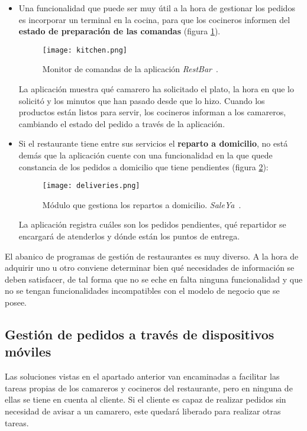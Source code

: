 \begin{itemize}
    \item Una funcionalidad que puede ser muy útil a la hora de gestionar
    los pedidos es incorporar un terminal en la cocina, para que los cocineros
    informen del \textbf{estado de preparación de las comandas} (figura
    \ref{fig:kitchen}).

    \begin{figure}[!h]
      \begin{center}
        \texttt{[image: kitchen.png]}
        \caption{Monitor de comandas de la aplicación
        \emph{RestBar}~\cite{bib:restBar}.}
        \label{fig:kitchen}
      \end{center}
    \end{figure}
    
    La aplicación muestra qué camarero ha solicitado el plato, la hora en que
    lo solicitó y los minutos que han pasado desde que lo hizo. Cuando los
    productos están listos para servir, los cocineros informan a los
    camareros, cambiando el estado del pedido a través de la aplicación.

    \item Si el restaurante tiene entre sus servicios el \textbf{reparto a
    domicilio}, no está demás que la aplicación cuente con una funcionalidad
    en la que quede constancia de los pedidos a domicilio que tiene pendientes
    (figura \ref{fig:deliveries}):

    \begin{figure}[!h]
      \begin{center}
        \texttt{[image: deliveries.png]}
        \caption{Módulo que gestiona los repartos a domicilio.
        \emph{SaleYa}~\cite{bib:saleYa}.}
        \label{fig:deliveries}
      \end{center}
    \end{figure}

    La aplicación registra cuáles son los pedidos pendientes, qué repartidor
    se encargará de atenderlos y dónde están los puntos de entrega.
    \end{itemize}

    El abanico de programas de gestión de restaurantes es muy diverso. A la
    hora de adquirir uno u otro conviene determinar bien qué necesidades de
    información se deben satisfacer, de tal forma que no se eche en falta 
    ninguna funcionalidad y que no se tengan funcionalidades incompatibles
    con el modelo de negocio que se posee.

    \subsection{Gestión de pedidos a través de dispositivos móviles}
    Las soluciones vistas en el apartado anterior van encaminadas a
    facilitar las tareas propias de los camareros y cocineros del restaurante,
    pero en ninguna de ellas se tiene en cuenta al cliente. Si el cliente es
    capaz de realizar pedidos sin necesidad de avisar a un camarero, este
    quedará liberado para realizar otras tareas.

